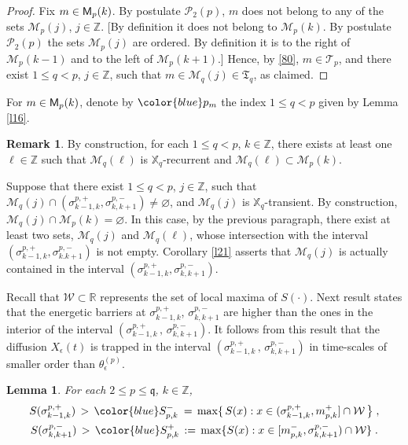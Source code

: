 \documentclass[reqno]{amsart}
\theoremstyle{plain}
\newtheorem{lemma}[theorem]{Lemma}
\theoremstyle{definition}
\newtheorem{remark}[theorem]{Remark}
\newcommand{\mc}[1]{{\mathcal #1}}
\newcommand{\mf}[1]{{\mathfrak #1}}
\newcommand{\bb}[1]{{\mathbb #1}}
\newcommand{\ms}[1]{{\mathscr #1}}
\newcommand{\mss}[1]{{\textsf #1}}
\newcounter{as}[section]
\newcommand{\<}{\langle}
\renewcommand{\>}{\rangle}
\begin{document}
\begin{proof}
Fix $m\in \mss M_p(k)$. By postulate $\ms P_2(p)$, $m$ does not belong
to any of the sets $\ms M _p(j)$, $j\in \bb Z$. [By definition it does
not belong to $\ms M_p(k)$. By postulate $\ms P_2(p)$ the sets
$\ms M_{p}(j)$ are ordered. By definition it is to the right of
$\ms M_p(k-1)$ and to the left of $\ms M_p(k+1)$.] Hence, by
\eqref{80}, $m\in \ms T_p$, and there exist $1\le q < p$,
$j \in \bb Z$, such that $m \in \ms M_{q} (j) \in \mf T_q$, as
claimed.
\end{proof}

For $m\in \mss M_p(k)$, denote by $\color{blue} p_m$ the index
$1\le q<p$ given by Lemma \ref{l16}.


\begin{remark}
\label{l19} 
By construction, for each $1\le q<p$, $k\in \bb Z$, there exists at
least one $\ell\in \bb Z$ such that $\ms M_{q}(\ell)$ is
$\bb X_q$-recurrent and $\ms M_{q}(\ell) \subset \ms M_{p}(k)$. 

Suppose that there exist $1\le q<p$, $j\in \bb Z$, such that
$\ms M_q(j) \cap (\sigma^{p,+}_{k-1,k} , \sigma^{p,-}_{k,k+1}) \neq
\varnothing$, and $\ms M_q(j)$ is $\bb X_q$-transient. By
construction, $\ms M_q(j) \cap \ms M_{p}(k) = \varnothing$. In this
case, by the previous paragraph, there exist at least two sets,
$\ms M_q(j)$ and $\ms M_{q}(\ell)$, whose intersection with the
interval $(\sigma^{p,+}_{k-1,k} , \sigma^{p,-}_{k.k+1})$ is not
empty. Corollary \ref{l21} asserts that $\ms M_q(j)$ is actually
contained in the interval
$(\sigma^{p,+}_{k-1,k} , \sigma^{p,-}_{k,k+1})$.
\end{remark}



Recall that $\mc W\subset \bb R$ represents the set of local maxima of
$S(\cdot)$. Next result states that the energetic barriers at
$\sigma^{p,+}_{k-1,k}$, $\sigma^{p,-}_{k,k+1}$ are higher than the ones in
the interior of the interval
$(\sigma^{p,+}_{k-1,k}\,,\, \sigma^{p,-}_{k,k+1})$.  It follows from this
result that the diffusion $X_\epsilon (t)$ is trapped in the interval
$(\sigma^{p,+}_{k-1,k}\,,\, \sigma^{p,-}_{k,k+1})$ in time-scales of smaller
order than $\theta^{(p)}_\epsilon$.

\begin{lemma}
\label{l15}
For each $2\le p \le \mf q$, $k\in \bb Z$,
\begin{gather*}
S(\sigma^{p,+}_{k-1,k}) \,>\, {\color{blue} S^-_{p,k}}
\:=\, \max \{ \, S(x) :
x\in (\sigma^{p,+}_{k-1,k} ,  m^+_{p,k}] \cap \mc W\, \big\}\;, 
\\
S(\sigma^{p,-}_{k,k+1})  
\,>\, {\color{blue} S^+_{p,k}} \,:=\,
\max \{ S(x) : x\in  [m^-_{p,k} , \sigma^{p,-}_{k,k+1} ) \cap \mc W\} \;.
\end{gather*}
\end{lemma}
\end{document}
